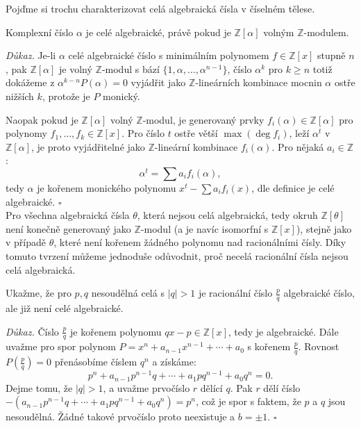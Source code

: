 \documentclass[12pt]{report}
\begin{document}
Pojďme si trochu charakterizovat celá algebraická čísla v číselném tělese.

\begin{veta}\label{alg}
Komplexní číslo $\alpha$ je celé algebraické, právě pokud je $\mathbb{Z}[\alpha]$ volným $\mathbb{Z}$-modulem.
\end{veta}
\noindent \textit{Důkaz.} Je-li $\alpha$ celé algebraické číslo s minimálním polynomem $f \in \mathbb{Z}[x]$ stupně $n$, pak $\mathbb{Z}[\alpha]$ je volný $\mathbb{Z}$-modul s bází $\lbrace 1,\alpha,\dots,\alpha^{n-1} \rbrace$, číslo $\alpha^k$ pro $k\geqslant n$ totiž dokážeme z $\alpha^{k-n} P(\alpha) = 0$ vyjádřit jako $\mathbb{Z}$-lineárních kombinace mocnin $\alpha$ ostře nižších $k$, protože je $P$ monický.

Naopak pokud je $\mathbb{Z}[\alpha]$ volný $\mathbb{Z}$-modul, je generovaný prvky $f_i(\alpha) \in \mathbb{Z}[\alpha]$ pro polynomy $f_1,\dots,f_k \in \mathbb{Z}[x]$. Pro číslo $t$ ostře větší $\max{(\deg f_i)}$, leží $\alpha^t$ v $\mathbb{Z}[\alpha]$, je proto vyjádřitelné jako $\mathbb{Z}$-lineární kombinace $f_i(\alpha)$. Pro nějaká $a_i \in \mathbb{Z}$:
\begin{equation*}
\alpha^t = \sum a_i f_i(\alpha),
\end{equation*}
tedy $\alpha$ je kořenem monického polynomu $x^t - \sum a_i f_i(x)$, dle definice je celé algebraické. \hfill $\square$\\

Pro všechna algebraická čísla $\theta$, která nejsou celá algebraická, tedy okruh $\mathbb{Z}[\theta]$ není konečně generovaný jako $\mathbb{Z}$-modul (a je navíc isomorfní s $\mathbb{Z}[x]$), stejně jako v případě $\theta$, které není kořenem žádného polynomu nad racionálními čísly.  Díky tomuto tvrzení můžeme jednoduše odůvodnit, proč necelá racionální čísla nejsou celá algebraická.
\begin{priklad}\label{racalg}
Ukažme, že pro $p,q$ nesoudělná celá s $\vert q\vert > 1$ je racionální číslo $\frac{p}{q}$ algebraické číslo, ale již není celé algebraické.
\end{priklad}
\noindent \textit{Důkaz.} Číslo $\frac{p}{q}$ je kořenem polynomu $qx-p \in \mathbb{Z}[x]$, tedy je algebraické. Dále uvažme pro spor polynom $P = x^n + a_{n-1} x^{n-1} + \cdots  + a_0$ s kořenem $\frac{p}{q}$. Rovnost $P\left(\frac{p}{q} \right)=0$ přenásobíme číslem $q^n$ a získáme:
\begin{equation*}
p^n + a_{n-1} p^{n-1} q + \cdots + a_1 p q^{n-1} + a_0 q^n = 0.
\end{equation*}
Dejme tomu, že $\vert q \vert > 1$, a uvažme prvočíslo $r$ dělící $q$. Pak $r$ dělí číslo $-(a_{n-1} p^{n-1} q + \cdots + a_1 p q^{n-1} + a_0 q^n) = p^n$, což je spor s faktem, že $p$ a $q$ jsou nesoudělná. Žádné takové prvočíslo proto neexistuje a $b = \pm 1$. \hfill $\square$ 
\end{document}
